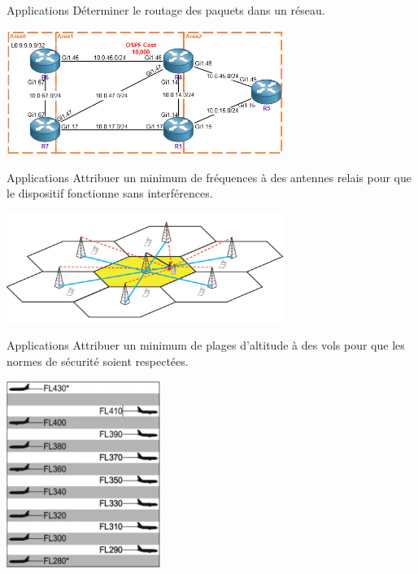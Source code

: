 \documentclass[10pt]{beamer}
\begin{document}
\begin{frame}{Applications}
Déterminer le routage des paquets dans un réseau.
\begin{center}
\includegraphics[width=9cm]{img/ospf}
\end{center}
\end{frame}

\begin{frame}{Applications}
Attribuer un minimum de fréquences à des antennes relais pour que le dispositif fonctionne sans interférences.
\begin{center}
\includegraphics[width=9cm]{img/relais}
\end{center}
\end{frame}

\begin{frame}{Applications}
Attribuer un minimum de plages d'altitude à des vols pour que les normes de sécurité soient respectées.
\begin{center}
\includegraphics[width=5cm]{img/vols}
\end{center}
\end{frame}
\end{document}
